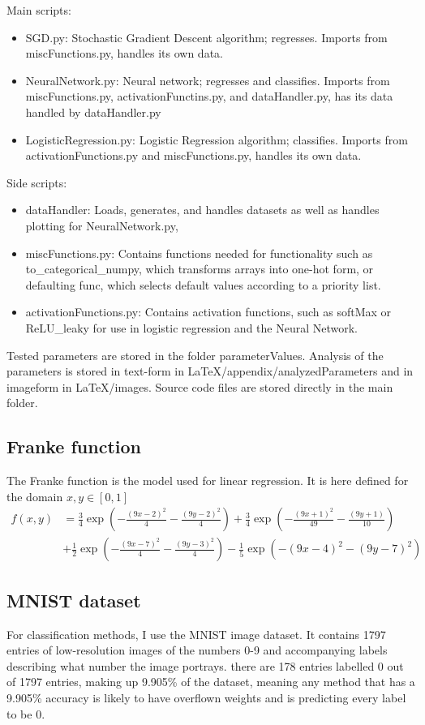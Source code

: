 \documentclass[a4paper, UKenglish]{article}
\newcommand{\0}{\mathbf{0}}
\newcommand{\1}{\mathbf{1}}
\begin{document}
Main scripts:
\begin{itemize}
\item SGD.py: Stochastic Gradient Descent algorithm; regresses. Imports from miscFunctions.py, handles its own data.
\item NeuralNetwork.py: Neural network; regresses and classifies. Imports from miscFunctions.py, activationFunctins.py, and dataHandler.py, has its data handled by dataHandler.py
\item LogisticRegression.py: Logistic Regression algorithm; classifies. Imports from activationFunctions.py and miscFunctions.py, handles its own data.
\end{itemize}

Side scripts:
\begin{itemize}
\item dataHandler: Loads, generates, and handles datasets as well as handles plotting for NeuralNetwork.py, 
\item miscFunctions.py: Contains functions needed for functionality such as to\_categorical\_numpy, which transforms arrays into one-hot form, or defaulting func, which selects default values according to a priority list.
\item activationFunctions.py: Contains activation functions, such as softMax or ReLU\_leaky for use in logistic regression and the Neural Network.
\end{itemize}

Tested parameters are stored in the folder parameterValues. Analysis of the parameters is stored in text-form in LaTeX/appendix/analyzedParameters and in imageform in LaTeX/images. Source code files are stored directly in the main folder.


\subsection{Franke function} \label{sec:Franke}
The Franke function is the model used for linear regression. It is here defined for the domain $x,y \in [0,1]$
\begin{align*}
f(x,y) &= \frac{3}{4}\exp{\left(-\frac{(9x-2)^2}{4} - \frac{(9y-2)^2}{4}\right)}+\frac{3}{4}\exp{\left(-\frac{(9x+1)^2}{49}- \frac{(9y+1)}{10}\right)} \\
&+\frac{1}{2}\exp{\left(-\frac{(9x-7)^2}{4} - \frac{(9y-3)^2}{4}\right)} -\frac{1}{5}\exp{\left(-(9x-4)^2 - (9y-7)^2\right) }
\end{align*}


\subsection{MNIST dataset} \label{sec:MNIST}
For classification methods, I use the MNIST image dataset. It contains 1797 entries of low-resolution images of the numbers 0-9 and accompanying labels describing what number the image portrays. there are 178 entries labelled 0 out of 1797 entries, making up 9.905\% of the dataset, meaning any method that has a 9.905\% accuracy is likely to have overflown weights and is predicting every label to be 0.
\end{document}
